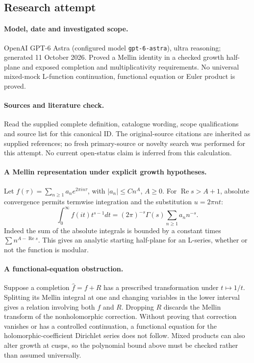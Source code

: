 \documentclass[11pt]{article}
\begin{document}
\subsection{Research attempt}
\paragraph{Model, date and investigated scope.}
OpenAI GPT-6 Astra (configured model \texttt{gpt-6-astra}), ultra reasoning; generated 11 October 2026. Proved a Mellin identity in a checked growth half-plane and exposed completion and multiplicativity requirements. No universal mixed-mock L-function continuation, functional equation or Euler product is proved.

\paragraph{Sources and literature check.}
Read the supplied complete definition, catalogue wording, scope qualifications and source list for this canonical ID. The original-source citations are inherited as supplied references; no fresh primary-source or novelty search was performed for this attempt. No current open-status claim is inferred from this calculation.

\paragraph{A Mellin representation under explicit growth hypotheses.}Let \(f(\tau)=\sum_{n\ge1}a_ne^{2\pi in\tau}\), with \(|a_n|\le Cn^A\), \(A\ge0\). For \(\operatorname{Re}s>A+1\), absolute convergence permits termwise integration and the substitution \(u=2\pi nt\):
\[\int_0^\infty f(it)t^{s-1}dt=(2\pi)^{-s}\Gamma(s)\sum_{n\ge1}a_nn^{-s}.
\]
Indeed the sum of the absolute integrals is bounded by a constant times \(\sum n^{A-\operatorname{Re}s}\). This gives an analytic starting half-plane for an L-series, whether or not the function is modular.
\paragraph{A functional-equation obstruction.}Suppose a completion \(\widehat f=f+R\) has a prescribed transformation under \(t\mapsto1/t\). Splitting its Mellin integral at one and changing variables in the lower interval gives a relation involving both \(f\) and \(R\). Dropping \(R\) discards the Mellin transform of the nonholomorphic correction. Without proving that correction vanishes or has a controlled continuation, a functional equation for the holomorphic-coefficient Dirichlet series does not follow. Mixed products can also alter growth at cusps, so the polynomial bound above must be checked rather than assumed universally.
\end{document}
